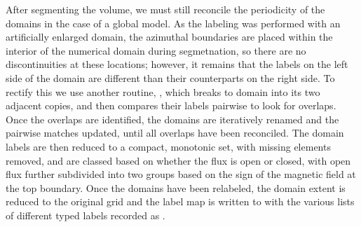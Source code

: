 \documentclass[10pt]{aastex62}
\begin{document}
\begin{itemize}
After segmenting the volume, we must still reconcile the periodicity of the domains in the case of a global model.
As the labeling was performed with an artificially enlarged domain, the azimuthal boundaries are placed within the interior of the numerical domain during segmetnation, so there are no discontinuities at these locations;
however, it remains that the labels on the left side of the domain are different than their counterparts on the right side. 
To rectify this we use another routine, , which breaks to domain into its two adjacent copies, and then compares their labels pairwise to look for overlaps.
Once the overlaps are identified, the domains are iteratively renamed and the pairwise matches updated, until all overlaps have been reconciled. 
The domain labels are then reduced to a compact, monotonic set, with missing elements removed, and are classed based on whether the flux is open or closed, with open flux further subdivided into two groups based on the sign of the magnetic field at the top boundary.
Once the domains have been relabeled, the domain extent is reduced to the original grid and the label map is written to  with the various lists of different typed labels recorded as . 



\end{itemize}
\end{document}
